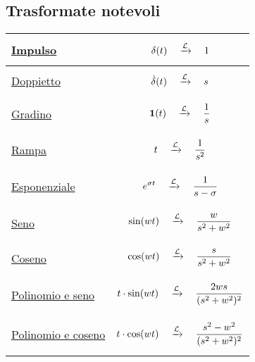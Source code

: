 \documentclass[../main.tex]{subfiles}
\begin{document}
	\subsection{Trasformate notevoli}
	\bgroup
	\def\arraystretch{0.2} %
	\begin{tabular}{|>{\centering\arraybackslash}m{1.5in}|>{\centering\arraybackslash}m{4in}|}
		\hline
		\hyperref[sec:trasf_impulso]{Impulso}& $$ \delta (t) \quad \xrightarrow{\mathcal{L}} \quad 1 $$\\
		\hline
		\hyperref[sec:trasf_doppietto]{Doppietto} & $$ \dot{\delta}(t) \quad \xrightarrow{\mathcal{L}} \quad s $$\\
		\hline
		\hyperref[sec:trasf_gradino]{Gradino} & $$ \textbf{1}(t) \quad \xrightarrow{\mathcal{L}} \quad \frac{1}{s} $$\\
		\hline
		\hyperref[sec:trasf_rampa]{Rampa} & $$ t \quad \xrightarrow{\mathcal{L}} \quad \frac{1}{s^2} $$\\
		\hline
		\hyperref[sec:trasf_esponenziale]{Esponenziale} & $$ e^{\sigma t} \quad \xrightarrow{\mathcal{L}} \quad \frac{1}{s-\sigma} $$\\
		\hline
		\hyperref[sec:trasf_seno]{Seno} & $$ \sin(wt) \quad \xrightarrow{\mathcal{L}} \quad \frac{w}{s^2+w^2} $$\\
		\hline
		\hyperref[sec:trasf_coseno]{Coseno} & $$ \cos(wt) \quad \xrightarrow{\mathcal{L}} \quad \frac{s}{s^2+w^2} $$\\
		\hline
		\hyperref[sec:trasf_t_seno]{Polinomio e seno} & $$ t \cdot \sin(wt) \quad \xrightarrow{\mathcal{L}} \quad \frac{2ws}{(s^2+w^2)^2} $$\\
		\hline
		\hyperref[sec:trasf_t_coseno]{Polinomio e coseno} & $$ t \cdot \cos(wt) \quad \xrightarrow{\mathcal{L}} \quad \frac{s^2-w^2}{(s^2+w^2)^2} $$\\
		\hline
	\end{tabular}
	\egroup
\end{document}
